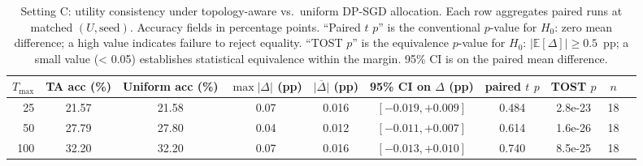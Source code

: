 \begin{table}[t]
\centering
\caption{Setting C: utility consistency under topology-aware vs.\ uniform DP-SGD allocation. Each row aggregates paired runs at matched $(U, \text{seed})$. Accuracy fields in percentage points. ``Paired $t$ $p$'' is the conventional $p$-value for $H_0$: zero mean difference; a high value indicates failure to reject equality. ``TOST $p$'' is the equivalence $p$-value for $H_0$: $|\mathbb{E}[\Delta]|\ge 0.5$~pp; a small value (< 0.05) establishes statistical equivalence within the margin. 95\% CI is on the paired mean difference.}
\label{tab:util-consistency-c}
\begin{tabular}{@{}rccccccccc@{}}
\toprule
$T_{\max}$ & TA acc (\%) & Uniform acc (\%) & $\max|\Delta|$ (pp) & $\overline{|\Delta|}$ (pp) & 95\% CI on $\Delta$ (pp) & paired $t$ $p$ & TOST $p$ & $n$ \\
\midrule
25 & 21.57 & 21.58 & 0.07 & 0.016 & $[-0.019, +0.009]$ & 0.484 & 2.8e-23 & 18 \\
50 & 27.79 & 27.80 & 0.04 & 0.012 & $[-0.011, +0.007]$ & 0.614 & 1.6e-26 & 18 \\
100 & 32.20 & 32.20 & 0.07 & 0.016 & $[-0.013, +0.010]$ & 0.740 & 8.5e-25 & 18 \\
\bottomrule
\end{tabular}
\end{table}
